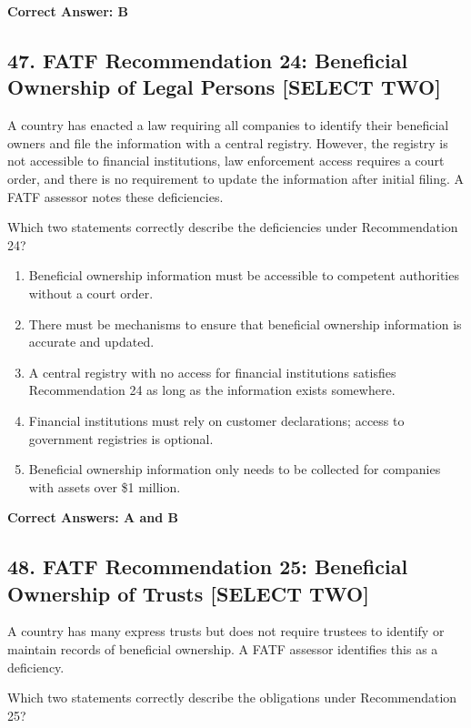 \documentclass[11pt,a4paper]{article}
\begin{document}
	\textbf{Correct Answer: B}
	
	\subsection{47. FATF Recommendation 24: Beneficial Ownership of Legal Persons \textnormal{[SELECT TWO]}}
	
	A country has enacted a law requiring all companies to identify their beneficial owners and file the information with a central registry. However, the registry is not accessible to financial institutions, law enforcement access requires a court order, and there is no requirement to update the information after initial filing. A FATF assessor notes these deficiencies.
	
	Which two statements correctly describe the deficiencies under Recommendation 24?
	
	\begin{enumerate}[label=\Alph*.]
		\item Beneficial ownership information must be accessible to competent authorities without a court order.
		\item There must be mechanisms to ensure that beneficial ownership information is accurate and updated.
		\item A central registry with no access for financial institutions satisfies Recommendation 24 as long as the information exists somewhere.
		\item Financial institutions must rely on customer declarations; access to government registries is optional.
		\item Beneficial ownership information only needs to be collected for companies with assets over \$1 million.
	\end{enumerate}
	
	\textbf{Correct Answers: A and B}
	
	\subsection{48. FATF Recommendation 25: Beneficial Ownership of Trusts \textnormal{[SELECT TWO]}}
	
	A country has many express trusts but does not require trustees to identify or maintain records of beneficial ownership. A FATF assessor identifies this as a deficiency.
	
	Which two statements correctly describe the obligations under Recommendation 25?
	
\end{document}
